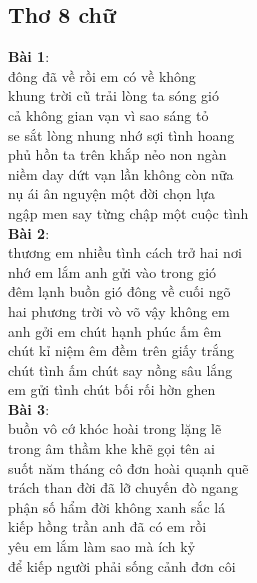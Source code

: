 \documentclass[a4paper]{article}
\theoremstyle{definition}
\begin{document}
\subsection{Thơ 8 chữ}
\newline
\textbf{Bài 1}: \\

 đông đã về rồi em có về không \\
 khung trời cũ trải lòng ta sóng gió\\ 
 cả không gian vạn vì sao sáng tỏ \\
 se sắt lòng nhung nhớ sợi tình hoang \\
 phủ hồn ta trên khắp nẻo non ngàn \\
 niềm day dứt vạn lần không còn nữa \\
 nụ ái ân nguyện một đời chọn lựa \\
 ngập men say từng chập một cuộc tình\\


\textbf{Bài 2}:\\
 thương em nhiều tình cách trở hai nơi\\ 
 nhớ em lắm anh gửi vào trong gió \\
 đêm lạnh buồn gió đông về cuối ngõ \\
 hai phương trời vò võ vậy không em \\
 anh gởi em chút hạnh phúc ấm êm \\
 chút kỉ niệm êm đềm trên giấy trắng \\ 
 chút tình ấm chút say nồng sâu lắng \\
 em gửi tình chút bối rối hờn ghen\\

\textbf{Bài 3}: \\
buồn vô cớ khóc hoài trong lặng lẽ \\
 trong âm thầm khe khẽ gọi tên ai \\
 suốt năm tháng cô đơn hoài quạnh quẽ\\ 
 trách than đời đã lỡ chuyến đò ngang \\
 phận số hẩm đời không xanh sắc lá \\
 kiếp hồng trần anh đã có em rồi \\
 yêu em lắm làm sao mà ích kỷ \\
 để kiếp người phải sống cảnh đơn côi\\
\end{document}
